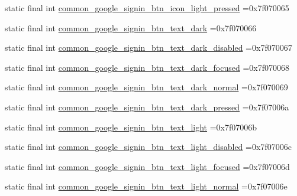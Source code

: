 \begin{DoxyCompactItemize}
\item 
static final int \mbox{\hyperlink{classbr_1_1unb_1_1cic_1_1mp_1_1marketmaster_1_1test_1_1R_1_1drawable_a68e91d7ed3b0210d88596e279d89b7e6}{common\+\_\+google\+\_\+signin\+\_\+btn\+\_\+icon\+\_\+light\+\_\+pressed}} =0x7f070065
\item 
static final int \mbox{\hyperlink{classbr_1_1unb_1_1cic_1_1mp_1_1marketmaster_1_1test_1_1R_1_1drawable_a1ef8cc7739155957a79e51b66253257b}{common\+\_\+google\+\_\+signin\+\_\+btn\+\_\+text\+\_\+dark}} =0x7f070066
\item 
static final int \mbox{\hyperlink{classbr_1_1unb_1_1cic_1_1mp_1_1marketmaster_1_1test_1_1R_1_1drawable_a42fb8c49a2d760eea35a275f4d6d2c95}{common\+\_\+google\+\_\+signin\+\_\+btn\+\_\+text\+\_\+dark\+\_\+disabled}} =0x7f070067
\item 
static final int \mbox{\hyperlink{classbr_1_1unb_1_1cic_1_1mp_1_1marketmaster_1_1test_1_1R_1_1drawable_a323a3936adab08e7291d444acfcb2544}{common\+\_\+google\+\_\+signin\+\_\+btn\+\_\+text\+\_\+dark\+\_\+focused}} =0x7f070068
\item 
static final int \mbox{\hyperlink{classbr_1_1unb_1_1cic_1_1mp_1_1marketmaster_1_1test_1_1R_1_1drawable_abd49bb8b8569eb287f34026d1c78aac9}{common\+\_\+google\+\_\+signin\+\_\+btn\+\_\+text\+\_\+dark\+\_\+normal}} =0x7f070069
\item 
static final int \mbox{\hyperlink{classbr_1_1unb_1_1cic_1_1mp_1_1marketmaster_1_1test_1_1R_1_1drawable_ac7a32b4dfb8dbd0eba9218fb7b2851ff}{common\+\_\+google\+\_\+signin\+\_\+btn\+\_\+text\+\_\+dark\+\_\+pressed}} =0x7f07006a
\item 
static final int \mbox{\hyperlink{classbr_1_1unb_1_1cic_1_1mp_1_1marketmaster_1_1test_1_1R_1_1drawable_a663ac21c7f58305c631100b61d0ceaf2}{common\+\_\+google\+\_\+signin\+\_\+btn\+\_\+text\+\_\+light}} =0x7f07006b
\item 
static final int \mbox{\hyperlink{classbr_1_1unb_1_1cic_1_1mp_1_1marketmaster_1_1test_1_1R_1_1drawable_a73c50dc60ad88d967007aef2ce995560}{common\+\_\+google\+\_\+signin\+\_\+btn\+\_\+text\+\_\+light\+\_\+disabled}} =0x7f07006c
\item 
static final int \mbox{\hyperlink{classbr_1_1unb_1_1cic_1_1mp_1_1marketmaster_1_1test_1_1R_1_1drawable_a7b271dc8cff3cedcaee8ac165fb5dcda}{common\+\_\+google\+\_\+signin\+\_\+btn\+\_\+text\+\_\+light\+\_\+focused}} =0x7f07006d
\item 
static final int \mbox{\hyperlink{classbr_1_1unb_1_1cic_1_1mp_1_1marketmaster_1_1test_1_1R_1_1drawable_a9cae70c0b7b1f3df30955ebda16d25f5}{common\+\_\+google\+\_\+signin\+\_\+btn\+\_\+text\+\_\+light\+\_\+normal}} =0x7f07006e

\end{DoxyCompactItemize}
